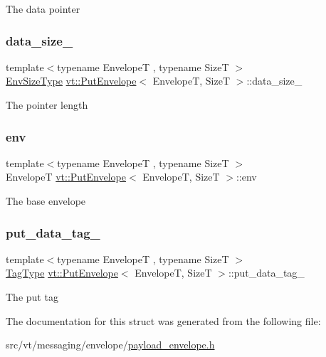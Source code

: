 The data pointer \mbox{\label{structvt_1_1_put_envelope_a1f30fc6ecbceff781ad132605c453b56}} 
\subsubsection{\texorpdfstring{data\+\_\+size\+\_\+}{data\_size\_}}
{\footnotesize\ttfamily template$<$typename EnvelopeT , typename SizeT $>$ \\
\hyperlink{structvt_1_1_put_envelope_ad086e484eb23ab04b0a055aff2cb7b19}{Env\+Size\+Type} \hyperlink{structvt_1_1_put_envelope}{vt\+::\+Put\+Envelope}$<$ EnvelopeT, SizeT $>$\+::data\+\_\+size\+\_\+}

The pointer length \mbox{\label{structvt_1_1_put_envelope_a046a6ec334cde93251c21eded8d3fbc4}} 
\subsubsection{\texorpdfstring{env}{env}}
{\footnotesize\ttfamily template$<$typename EnvelopeT , typename SizeT $>$ \\
EnvelopeT \hyperlink{structvt_1_1_put_envelope}{vt\+::\+Put\+Envelope}$<$ EnvelopeT, SizeT $>$\+::env}

The base envelope \mbox{\label{structvt_1_1_put_envelope_ac4a0614fbf3e30fcdeb13a376ccacffe}} 
\subsubsection{\texorpdfstring{put\+\_\+data\+\_\+tag\+\_\+}{put\_data\_tag\_}}
{\footnotesize\ttfamily template$<$typename EnvelopeT , typename SizeT $>$ \\
\hyperlink{namespacevt_a84ab281dae04a52a4b243d6bf62d0e52}{Tag\+Type} \hyperlink{structvt_1_1_put_envelope}{vt\+::\+Put\+Envelope}$<$ EnvelopeT, SizeT $>$\+::put\+\_\+data\+\_\+tag\+\_\+}

The put tag 

The documentation for this struct was generated from the following file\+:\begin{DoxyCompactItemize}
\item 
src/vt/messaging/envelope/\hyperlink{payload__envelope_8h}{payload\+\_\+envelope.\+h}\end{DoxyCompactItemize}
